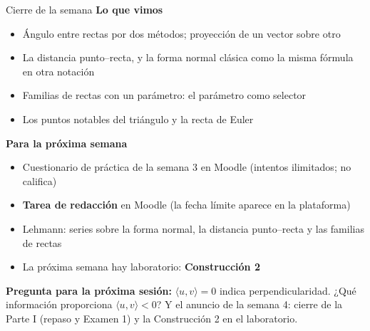 \documentclass[aspectratio=169,10pt]{beamer}
\newcommand{\destaca}[1]{%
  \par\vspace{3pt}\noindent
  \colorbox{turquesaClaro}{%
    \parbox{\dimexpr\linewidth-2\fboxsep\relax}{\vspace{3pt}#1\vspace{3pt}}}%
  \par\vspace{3pt}}
\newcommand{\pp}[2]{\langle #1,#2\rangle}
\begin{document}
\begin{frame}{Cierre de la semana}
  \textbf{Lo que vimos}
  {\small
  \begin{itemize}
    \item Ángulo entre rectas por dos métodos; proyección de un vector
      sobre otro
    \item La distancia punto--recta, y la forma normal clásica como la
      misma fórmula en otra notación
    \item Familias de rectas con un parámetro: el parámetro como
      selector
    \item Los puntos notables del triángulo y la recta de Euler
  \end{itemize}}

  \vspace{0.2cm}
  \textbf{Para la próxima semana}
  {\small
  \begin{itemize}
    \item Cuestionario de práctica de la semana 3 en Moodle
      (intentos ilimitados; no califica)
    \item \textbf{Tarea de redacción} en Moodle (la fecha límite
      aparece en la plataforma)
    \item Lehmann: series sobre la forma normal, la distancia
      punto--recta y las familias de rectas
    \item La próxima semana hay laboratorio: \textbf{Construcción 2}
  \end{itemize}}

  \vspace{0.2cm}
  \destaca{\textbf{Pregunta para la próxima sesión:} $\pp{u}{v}=0$
  indica perpendicularidad. ¿Qué información proporciona
  $\pp{u}{v}<0$? Y el anuncio de la semana 4: cierre de la Parte I
  (repaso y Examen 1) y la Construcción 2 en el laboratorio.}
\end{frame}
\end{document}
